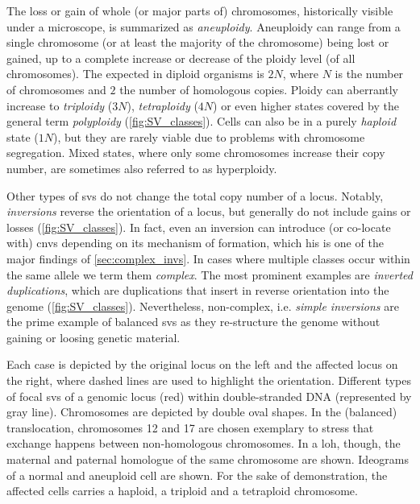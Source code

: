 The loss or gain of whole (or major parts of) chromosomes, historically visible
under a microscope, is summarized as \emph{aneuploidy}.
Aneuploidy can range from a single chromosome (or at least the majority of the
chromosome) being lost or gained, up to a complete increase or decrease of the
ploidy level (of all chromosomes). The expected 
in diploid organisms is $2N$, where $N$ is the number of chromosomes and $2$ the
number of homologous copies. Ploidy can aberrantly increase to \emph{triploidy}
($3N$), \emph{tetraploidy} ($4N$) or even higher states covered by the general term
\emph{polyploidy} (\cref{fig:SV_classes}). Cells can also be in a purely \emph{haploid} state ($1N$),
but they are rarely viable due to problems with chromosome segregation. Mixed
states, where only some chromosomes increase their copy number, are sometimes
also referred to as hyperploidy.

Other types of \acp{sv} do not change the total copy number of a locus. Notably,
\emph{inversions} reverse the orientation of a locus, but generally do not
include gains or losses (\cref{fig:SV_classes}). In fact, even an inversion can
introduce (or co-locate with) \acp{cnv} depending on its mechanism of formation,
which his is one of the major findings of \cref{sec:complex_invs}.
In cases where multiple \sv classes occur within the same allele we term them
\emph{complex}. The most prominent examples are \emph{inverted duplications},
which are duplications that insert in reverse orientation into the genome
(\cref{fig:SV_classes}). Nevertheless, non-complex, i.e. \emph{simple inversions}
are the prime example of balanced \acp{sv} as they re-structure the genome
without gaining or loosing genetic material.

    {Each case is depicted by the original locus on the left and the affected
    locus on the right, where dashed lines are used to highlight the orientation.
     Different types of focal \acp{sv} of a genomic locus (red)
    within double-stranded DNA (represented by gray line).  
    Chromosomes are depicted by double oval shapes. In the (balanced)
    translocation, chromosomes 12 and 17 are chosen exemplary to stress that
    exchange happens between non-homologous chromosomes. In a \acl{loh},
    though, the maternal and paternal homologue of the same chromosome are
    shown.  Ideograms of a normal and aneuploid cell are shown.
    For the sake of demonstration, the affected cells carries a haploid,
    a triploid and a tetraploid chromosome.}

